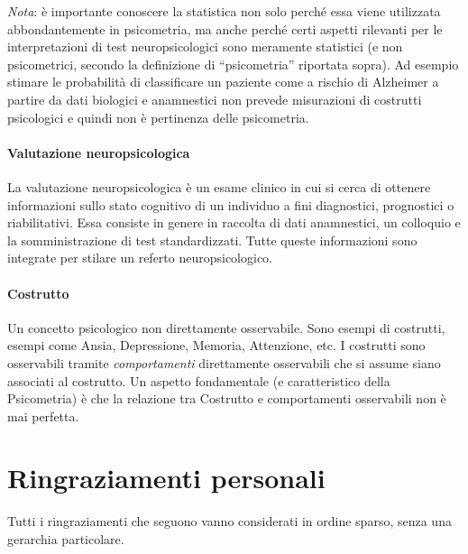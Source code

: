 \documentclass[
  italian,
  letterpaper,
  paper=A4,
  headinclude=on,
  footinclude=on,
  12pt]{scrbook}
\begin{document}
\emph{Nota}: è importante conoscere la statistica non solo perché essa
viene utilizzata abbondantemente in psicometria, ma anche perché certi
aspetti rilevanti per le interpretazioni di test neuropsicologici sono
meramente statistici (e non psicometrici, secondo la definizione di
``psicometria'' riportata sopra). Ad esempio stimare le probabilità di
classificare un paziente come a rischio di Alzheimer a partire da dati
biologici e anamnestici non prevede misurazioni di costrutti psicologici
e quindi non è pertinenza delle psicometria.

\subsubsection*{Valutazione
neuropsicologica}\label{valutazione-neuropsicologica}

La valutazione neuropsicologica è un esame clinico in cui si cerca di
ottenere informazioni sullo stato cognitivo di un individuo a fini
diagnostici, prognostici o riabilitativi. Essa consiste in genere in
raccolta di dati anamnestici, un colloquio e la somministrazione di test
standardizzati. Tutte queste informazioni sono integrate per stilare un
referto neuropsicologico.

\subsubsection*{Costrutto}\label{costrutto}

Un concetto psicologico non direttamente osservabile. Sono esempi di
costrutti, esempi come Ansia, Depressione, Memoria, Attenzione, etc. I
costrutti sono osservabili tramite \emph{comportamenti} direttamente
osservabili che si assume siano associati al costrutto. Un aspetto
fondamentale (e caratteristico della Psicometria) è che la relazione tra
Costrutto e comportamenti osservabili non è mai perfetta.

\chapter*{Ringraziamenti personali}\label{ringraziamenti_personali}


Tutti i ringraziamenti che seguono vanno considerati in ordine sparso,
senza una gerarchia particolare.
\end{document}

